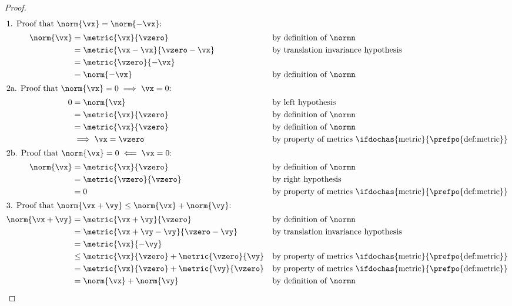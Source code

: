 \begin{proof}
\begin{align*}
  \intertext{1. Proof that $\norm{\vx} = \norm{-\vx}$:}
    \norm{\vx}
      &= \metric{\vx}{\vzero}
      && \text{by definition of $\normn$}
    \\&= \metric{\vx-\vx}{\vzero-\vx}
      && \text{by translation invariance hypothesis}
    \\&= \metric{\vzero}{-\vx}
    \\&= \norm{-\vx}
      && \text{by definition of $\normn$}
    \\
  \intertext{2a. Proof that $\norm{\vx} = 0 \implies \vx=0$:}
    0
      &= \norm{\vx}
      && \text{by left hypothesis}
    \\&= \metric{\vx}{\vzero}
      && \text{by definition of $\normn$}
    \\&= \metric{\vx}{\vzero}
      && \text{by definition of $\normn$}
    \\&\implies \vx=\vzero
      && \text{by property of metrics \ifdochas{metric}{\prefpo{def:metric}}}
    \\
  \intertext{2b. Proof that $\norm{\vx} = 0 \impliedby \vx=0$:}
    \norm{\vx}
      &= \metric{\vx}{\vzero}
      && \text{by definition of $\normn$}
    \\&= \metric{\vzero}{\vzero}
      && \text{by right hypothesis}
    \\&= 0
      && \text{by property of metrics \ifdochas{metric}{\prefpo{def:metric}}}
    \\
  \intertext{3. Proof that $\norm{\vx+\vy} \le \norm{\vx} + \norm{\vy}$:}
    \norm{\vx+\vy}
      &= \metric{\vx+\vy}{\vzero}
      && \text{by definition of $\normn$}
    \\&= \metric{\vx+\vy-\vy}{\vzero-\vy}
      && \text{by translation invariance hypothesis}
    \\&= \metric{\vx}{-\vy}
    \\&\le \metric{\vx}{\vzero} + \metric{\vzero}{\vy}
      && \text{by property of metrics \ifdochas{metric}{\prefpo{def:metric}}}
    \\&= \metric{\vx}{\vzero} + \metric{\vy}{\vzero}
      && \text{by property of metrics \ifdochas{metric}{\prefpo{def:metric}}}
    \\&= \norm{\vx} + \norm{\vy}
      && \text{by definition of $\normn$}
\end{align*}
\end{proof}


